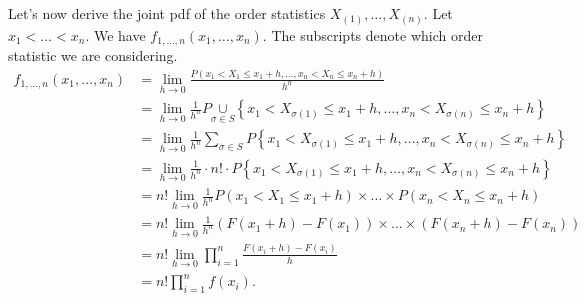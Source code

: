 Let's now derive the joint pdf of the order statistics $X_{(1)} , \ldots , X_{(n)}$. Let $x_1 < \ldots < x_{n}$. We have $f_{1, \ldots , n}\left( x_{1} , \ldots , x_{n} \right) $. The subscripts denote which order statistic we are considering.
\begin{align*}
	f_{1, \ldots , n}\left( x_{1} , \ldots , x_{n} \right) &= \lim_{h \to 0} \frac{P\left( x_1 <  X_1 \le  x_1 + h, \ldots , x_{n} < X_{n} \le  x_{n} + h \right)}{h ^{n}}  \\ 
							       &= \lim_{h \to 0} \frac{1}{h ^{n}} P \underset{\sigma \in  S}{\mathrm{\cup }}  \left\{  x_1 <  X_{\sigma(1)} \le  x_1 + h, \ldots , x_{n} < X_{\sigma(n)}\le  x_{n} + h \right\} \\
							       &= \lim_{h \to 0} \frac{1}{h ^{n}} \sum_{\sigma \in  S} P  \left\{  x_1 <  X_{\sigma(1)} \le  x_1 + h, \ldots , x_{n} < X_{\sigma(n)}\le  x_{n} + h \right\} \\
							       &= \lim_{h \to 0} \frac{1}{h ^{n}}\cdot n! \cdot P  \left\{  x_1 <  X_{\sigma(1)} \le  x_1 + h, \ldots , x_{n} < X_{\sigma(n)}\le  x_{n} + h \right\} \\
							       &= n! \lim_{h \to 0} \frac{1}{h^{n}} P\left( x_1 < X_1 \le  x_1 + h \right) \times  \ldots \times P\left( x_{n} < X_{n} \le x_{n} + h \right)  \\
							       &= n! \lim_{h \to 0} \frac{1}{h^{n}} \left(F\left( x_1 + h \right) - F\left( x_1 \right) \right) \times  \ldots \times \left(F\left( x_{n} + h \right)  - F\left( x_{n} \right) \right)  \\
							       &= n! \lim_{h \to 0} \prod_{i=1}^{n} \frac{F\left( x_i + h \right) - F\left( x_i\right) }{h}  \\
							       &= n! \prod_{i=1}^{n} f\left( x_{i} \right)  
.\end{align*}
